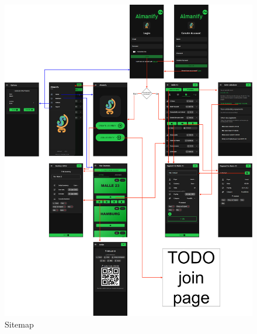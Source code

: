 \begin{figure}[H]
	\centering
	\includegraphics[width=\textwidth]{img/Sitemap}
	\caption[Sitemap]{Sitemap}
	\label{fig:Sitemap}
\end{figure}